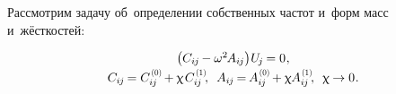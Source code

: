 \label{section:vibrations.smallperturbations}

\begin{otherlanguage}{russian}

Рассмотрим задачу об~определении собственных частот и~форм  масс и~жёсткостей:

\nopagebreak\vspace{-0.1em}\begin{equation}\begin{array}{c}
\bigl( C_{i\hspace{-0.1ex}j} \hspace{-0.15ex} - \omega^2 \hspace{-0.2ex} A_{i\hspace{-0.1ex}j} \bigr) \hspace{.1ex} U_{\hspace{-0.2ex}j} \hspace{-0.15ex} = 0 \hspace{.1ex} ,
\\[.2em]
%
C_{i\hspace{-0.1ex}j} \hspace{-0.2ex} = C_{i\hspace{-0.1ex}j}^{\hspace{.2ex}\scalebox{0.66}[0.66]{(0)}} \hspace{-0.2ex} + \smallparameter \hspace{.2ex} C_{i\hspace{-0.1ex}j}^{\hspace{.2ex}\scalebox{0.66}[0.66]{(1)}} \hspace{-0.4ex} ,
\;\:
A_{i\hspace{-0.1ex}j} \hspace{-0.2ex} = \hspace{-0.2ex} A_{i\hspace{-0.1ex}j}^{\hspace{.2ex}\scalebox{0.66}[0.66]{(0)}} \hspace{-0.2ex} + \smallparameter \hspace{-0.1ex} A_{i\hspace{-0.1ex}j}^{\hspace{.2ex}\scalebox{0.66}[0.66]{(1)}} \hspace{-0.4ex} ,
\;\:
\smallparameter \hspace{-0.12ex} \to 0 \hspace{.1ex} .
\end{array}\end{equation}


\end{otherlanguage}
